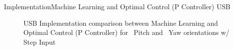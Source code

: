\documentclass{beamer}
\begin{document}
\begin{frame}{Implementation}{Machine Learning and Optimal Control (P Controller) USB}
    \begin{figure}
      \centering
      \caption{USB Implementation comparison between Machine Learning and Optimal Control (P Controller) for ~Pitch and ~Yaw orientations w/ Step Input}
      \label{fig:LQRvADP_USB}
    \end{figure}
\end{frame}
\end{document}
